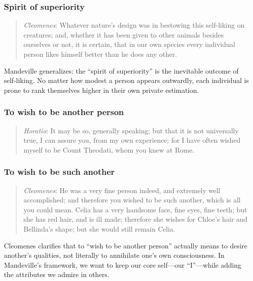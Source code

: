         \subsubsection{Spirit of superiority}

            \begin{quote}
                \textit{Cleomenes}: Whatever nature’s design was in bestowing this self-liking on creatures; and, whether it has been given to other animals besides ourselves or not, it is certain, that in our own species every individual person likes himself better than he does any other.
            \end{quote}

            Mandeville generalizes: the “spirit of superiority” is the inevitable outcome of self-liking. No matter how modest a person appears outwardly, each individual is prone to rank themselves higher in their own private estimation.

        \subsubsection{To wish to be another person}

            \begin{quote}
                \textit{Horatio}: It may be so, generally speaking; but that it is not universally true, I can assure you, from my own experience; for I have often wished myself to be Count Theodati, whom you knew at Rome.
            \end{quote}

        \subsubsection{To wish to be such another}

            \begin{quote}
                \textit{Cleomenes}: He was a very fine person indeed, and extremely well accomplished; and therefore you wished to be such another, which is all you could mean. Celia has a very handsome face, fine eyes, fine teeth; but she has red hair, and is ill made; therefore she wishes for Chloe’s hair and Bellinda’s shape; but she would still remain Celia.
            \end{quote}

            Cleomenes clarifies that to “wish to be another person” actually means to desire another’s qualities, not literally to annihilate one’s own consciousness. In Mandeville’s framework, we want to keep our core self—our “I”—while adding the attributes we admire in others.

